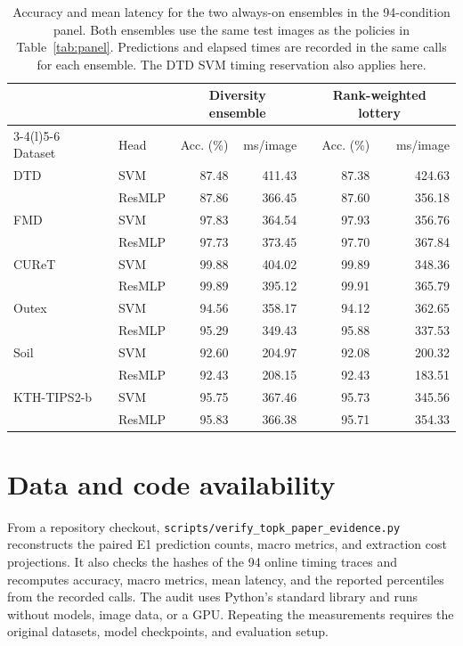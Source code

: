 \documentclass[10pt,a4paper,fleqn]{article}
\begin{document}
\begin{table}[htbp]
\centering
\caption{Accuracy and mean latency for the two always-on ensembles in the 94-condition panel. Both ensembles use the same test images as the policies in Table~\ref{tab:panel}. Predictions and elapsed times are recorded in the same calls for each ensemble. The DTD SVM timing reservation also applies here.}
\label{tab:panel-ensembles}
\begin{tabular}{@{}llrrrr@{}}
\toprule
 & & \multicolumn{2}{c}{Diversity ensemble} & \multicolumn{2}{c}{Rank-weighted lottery} \\
\cmidrule(lr){3-4}\cmidrule(l){5-6}
Dataset & Head & Acc. (\%) & ms/image & Acc. (\%) & ms/image \\
\midrule
DTD & SVM & 87.48 & 411.43 & 87.38 & 424.63 \\
 & ResMLP & 87.86 & 366.45 & 87.60 & 356.18 \\
FMD & SVM & 97.83 & 364.54 & 97.93 & 356.76 \\
 & ResMLP & 97.73 & 373.45 & 97.70 & 367.84 \\
CUReT & SVM & 99.88 & 404.02 & 99.89 & 348.36 \\
 & ResMLP & 99.89 & 395.12 & 99.91 & 365.79 \\
Outex & SVM & 94.56 & 358.17 & 94.12 & 362.65 \\
 & ResMLP & 95.29 & 349.43 & 95.88 & 337.53 \\
Soil & SVM & 92.60 & 204.97 & 92.08 & 200.32 \\
 & ResMLP & 92.43 & 208.15 & 92.43 & 183.51 \\
KTH-TIPS2-b & SVM & 95.75 & 367.46 & 95.73 & 345.56 \\
 & ResMLP & 95.83 & 366.38 & 95.71 & 354.33 \\
\bottomrule
\end{tabular}
\end{table}
\FloatBarrier

\section*{Data and code availability}

From a repository checkout, \nolinkurl{scripts/verify_topk_paper_evidence.py} reconstructs the paired E1 prediction counts, macro metrics, and extraction cost projections. It also checks the hashes of the 94 online timing traces and recomputes accuracy, macro metrics, mean latency, and the reported percentiles from the recorded calls. The audit uses Python's standard library and runs without models, image data, or a GPU. Repeating the measurements requires the original datasets, model checkpoints, and evaluation setup.
\end{document}
